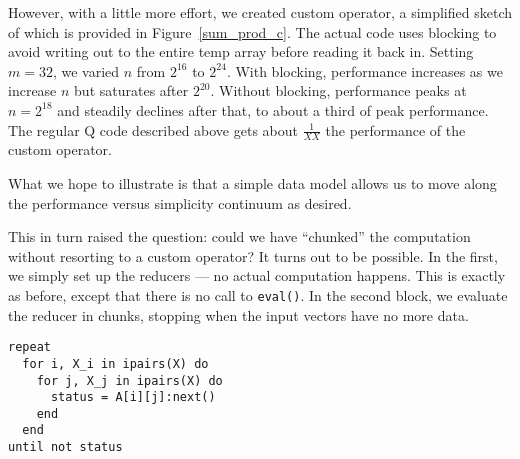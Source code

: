 However, with a little more effort, we created custom operator, 
a simplified sketch of which is provided in Figure~\ref{sum_prod_c}. The actual code
uses blocking to avoid writing out to the entire temp array before reading it
back in. Setting \(m=32\), we varied \(n\) from \(2^{16}\) to \(2^{24}\). With
blocking, performance increases as we increase \(n\) but saturates after
\(2^{20}\). Without blocking, performance peaks at \(n=2^{18}\) and steadily
declines after that, to about a third of peak performance.
The regular Q code described above gets about
\(\frac{1}{XX}\) the performance of the custom operator. 

What we hope to illustrate is that a
simple data model allows us to move along the performance versus simplicity
continuum as desired.

\begin{figure}
\centering
{}
\end{figure}

This in turn raised the question: could we have ``chunked'' the computation 
without resorting to a custom operator? It turns out to be possible. 
In the first, we simply set up the reducers --- no actual
computation happens. This is exactly as before, except that there is no call to
{\tt eval()}. In the second block, we evaluate the reducer in chunks, stopping
when the input vectors have no more data.
\begin{verbatim}
repeat 
  for i, X_i in ipairs(X) do
    for j, X_j in ipairs(X) do
      status = A[i][j]:next()
    end
  end
until not status
\end{verbatim}
